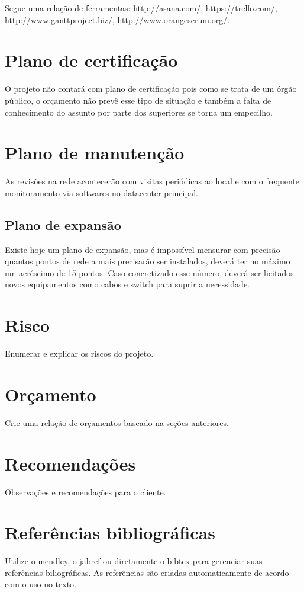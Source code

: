 \documentclass[	DIV=calc,%
							paper=a4,%
							fontsize=12pt,%
							onecolumn]{scrartcl}	 					%
\begin{document}
Segue uma relação de ferramentas:
http://asana.com/, 
https://trello.com/, 
http://www.ganttproject.biz/, 
http://www.orangescrum.org/. 

\section{Plano de certificação}
O projeto não contará com plano de certificação pois como se trata de um órgão público, o orçamento não prevê esse tipo de situação e também a falta de conhecimento do assunto por parte dos superiores se torna um empecilho. 

\section{Plano de manutenção}
As revisões na rede acontecerão com visitas periódicas ao local e com o frequente monitoramento via softwares no datacenter principal.

\subsection{Plano de expansão}
Existe hoje um plano de expansão, mas é impossível mensurar com precisão quantos pontos de rede a mais precisarão ser instalados, deverá ter no máximo um acréscimo de 15 pontos. Caso concretizado esse número, deverá ser licitados novos equipamentos como cabos e switch para suprir a necessidade.

\section{Risco}
Enumerar e explicar os riscos do projeto.

\section{Orçamento}
Crie uma relação de orçamentos baseado na seções anteriores.

\section{Recomendações}
Observações e recomendações para o cliente.

\section{Referências bibliográficas}
Utilize o mendley, o jabref ou diretamente o bibtex para gerenciar suas referências biliográficas. As referências são criadas automaticamente de acordo com o uso no texto.
\end{document}
